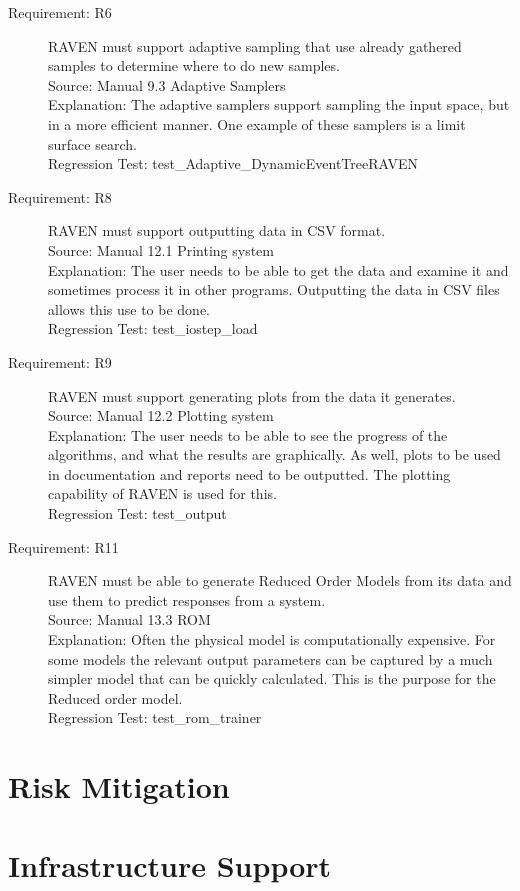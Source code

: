 \documentclass{article}
\newcommand{\requirement}[5]{\item[Requirement: #1] #2 \\Source: #3\\Explanation: #4\\Regression Test: #5}
\begin{document}
\begin{description}

\requirement{R6}{RAVEN must support adaptive sampling that use already gathered samples to determine where to do new samples.}
{Manual 9.3 Adaptive Samplers}
{The adaptive samplers support sampling the input space, but in a more efficient manner.  One example of these samplers is a limit surface search.}
{test\_Adaptive\_DynamicEventTreeRAVEN}

\requirement{R8}{RAVEN must support outputting data in CSV format.}
{Manual 12.1 Printing system}
{The user needs to be able to get the data and examine it and sometimes process it in other programs.  Outputting the data in CSV files allows this use to be done.}
{test\_iostep\_load}

\requirement{R9}{RAVEN must support generating plots from the data it generates.}
{Manual 12.2 Plotting system}
{The user needs to be able to see the progress of the algorithms, and what the results are graphically.  As well, plots to be used in documentation and reports need to be outputted.  The plotting capability of RAVEN is used for this.}
{test\_output}

\requirement{R11}{RAVEN must be able to generate Reduced Order Models from its data and use them to predict responses from a system.}
{Manual 13.3 ROM}
{Often the physical model is computationally expensive.  For some models the relevant output parameters can be captured by a much simpler model that can be quickly calculated.  This is the purpose for the Reduced order model.}
{test\_rom\_trainer}

\end{description}

\section{Risk Mitigation}



\section{Infrastructure Support}
\end{document}
